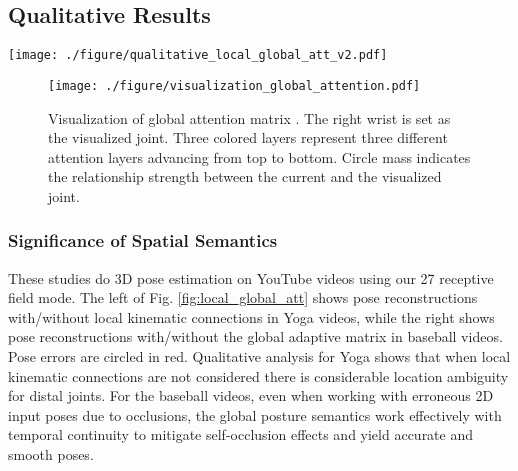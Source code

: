 \documentclass[letterpaper, 10 pt, conference, twoside]{ieeeconf}
\begin{document}
\subsection{Qualitative Results}
\begin{figure*}[thbp]
	\centering
	\texttt{[image: ./figure/qualitative\_local\_global\_att\_v2.pdf]}
	\caption{\textbf{Left}: Examples of results from our model with/without local kinematic connections . \textbf{Right}: Examples of results from our model with/without global adaptive matrix . Wrong estimations are labeled in red circles.}
	\label{fig:local_global_att}
\end{figure*}
\begin{figure}[t]
	\centering
	\texttt{[image: ./figure/visualization\_global\_attention.pdf]}
	\caption{Visualization of global attention matrix . The right wrist is set as the visualized joint. Three colored layers represent three different attention layers advancing from top to bottom. Circle mass indicates the relationship strength between the current and the visualized joint.}
	\label{fig:global_att_vis}
\end{figure}
\subsubsection{Significance of Spatial Semantics}
These studies do 3D pose estimation on YouTube videos using our 27 receptive field mode. The left of Fig. \ref{fig:local_global_att} shows pose reconstructions with/without local kinematic connections  in Yoga videos, while the right shows pose reconstructions with/without the global adaptive matrix  in baseball videos. Pose errors are circled in red. Qualitative analysis for Yoga shows that when local kinematic connections are not considered there is considerable location ambiguity for distal joints. For the baseball videos, even when working with erroneous 2D input poses due to occlusions, the global posture semantics work effectively with temporal continuity to mitigate self-occlusion effects and yield accurate and smooth poses.
\end{document}
